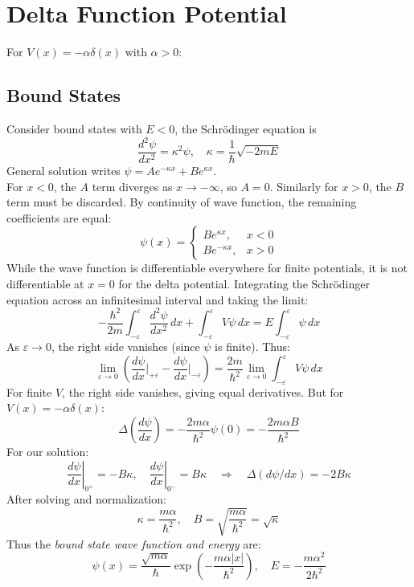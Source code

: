\section{Delta Function Potential}

For $V(x) = -\alpha\delta(x)$ with $\alpha > 0$:

\subsection{Bound States}
Consider bound states with $E < 0$, the Schrödinger equation is 
\[
\frac{d^2\psi}{dx^2} = \kappa^2\psi, \quad
\kappa = \frac{1}{\hbar}\sqrt{-2mE}
\]
General solution writes $\psi = Ae^{-\kappa x} + Be^{\kappa x}$. \\
For $x < 0$, the $A$ term diverges as $x \to -\infty$, so $A = 0$. Similarly for $x > 0$, the $B$ term must be discarded. 
By continuity of wave function, the remaining coefficients are equal:
\[
\psi(x) = \begin{cases} Be^{\kappa x}, & x < 0 \\ Be^{-\kappa x}, & x > 0 \end{cases}
\]
While the wave function is differentiable everywhere for finite potentials, it is not differentiable at $x = 0$ for the delta potential. Integrating the Schrödinger equation across an infinitesimal interval and taking the limit:
\[
-\frac{\hbar^2}{2m}\int_{-\varepsilon}^{\varepsilon}\frac{d^2\psi}{dx^2}\,dx + \int_{-\varepsilon}^{\varepsilon}V\psi\,dx = E\int_{-\varepsilon}^{\varepsilon}\psi\,dx
\]
As $\varepsilon \to 0$, the right side vanishes (since $\psi$ is finite). Thus:
\[
\lim_{\varepsilon\to 0}\left(\frac{d\psi}{dx}\bigg|_{+\varepsilon} - \frac{d\psi}{dx}\bigg|_{-\varepsilon}\right) = \frac{2m}{\hbar^2}\lim_{\varepsilon\to 0}\int_{-\varepsilon}^{\varepsilon}V\psi\,dx
\]
For finite $V$, the right side vanishes, giving equal derivatives. But for $V(x) = -\alpha\delta(x)$:
\[
\Delta\left(\frac{d\psi}{dx}\right) = -\frac{2m\alpha}{\hbar^2}\psi(0) = -\frac{2m\alpha B}{\hbar^2}
\]
For our solution: 
\[
\left.\frac{d\psi}{dx}\right|_{0^+} \!= -B\kappa, \quad
\left.\frac{d\psi}{dx}\right|_{0^-} \!= B\kappa
\quad\Rightarrow\quad 
\Delta(d\psi/dx) = -2B\kappa
\]
After solving and normalization:
\[
\kappa = \frac{m\alpha}{\hbar^2}, \quad
B = \sqrt{\frac{m\alpha}{\hbar^2}} = \sqrt{\kappa}
\]
Thus the \emph{bound state wave function and energy} are:
\[
\psi(x) = \frac{\sqrt{m\alpha}}{\hbar}\exp\left(-\frac{m\alpha|x|}{\hbar^2}\right), \quad E = -\frac{m\alpha^2}{2\hbar^2}
\]

